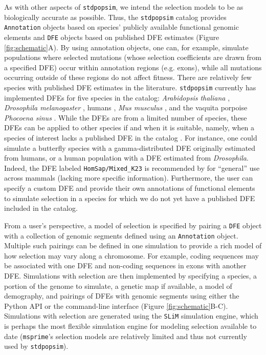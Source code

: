 \documentclass[hidelinks]{article}
\newcommand{\stdpopsim}{\texttt{stdpopsim}\xspace}
\newcommand{\slim}{\texttt{SLiM}\xspace}
\newcommand{\msprime}{\texttt{msprime}\xspace}
\begin{document}
    As with other aspects of \stdpopsim, we intend the selection models to be as biologically accurate as possible.
    Thus, the \stdpopsim catalog provides \texttt{Annotation} objects based on species' publicly available functional genomic elements
    and \texttt{DFE} objects based on published DFE estimates (Figure \ref{fig:schematic}A).
    By using annotation objects, one can, for example, simulate populations where selected mutations (whose selection
    coefficients are drawn from a specified DFE) occur within annotation regions (e.g. exons), while all mutations
    occurring outside of these regions do not affect fitness.
    There are relatively few species with published DFE estimates in the literature.
    \stdpopsim currently has implemented DFEs for five species in the catalog:
    \textit{Arabidopsis thaliana} \citep{huber2018gene},
    \textit{Drosophila melanogaster} \citep{ragsdale2016triallelic,huber2017determining,zhen2021greater},
    humans \citep{huber2017determining,kim2017inference,kyriazis2023using,castellano2019compmarison,castellano2019compmarison,rodrigues2024shared},
    \textit{Mus musculus} \citep{booker2021selective},
    and the vaquita porpoise \textit{Phocoena sinus} \citep{robinson2022critically}.
    While the DFEs are from a limited number of species, these DFEs can be applied to other species
    if and when it is suitable,
    namely, when a species of interest lacks a published DFE in the catalog .
    For instance, one could simulate a butterfly species with a gamma-distributed DFE originally
    estimated from humans, or a human population with a DFE estimated from \textit{Drosophila}.
    Indeed, the DFE labeled \texttt{HomSap/Mixed\_K23} is recommended by \citet{kyriazis2023using}
    for ``general'' use across mammals (lacking more specific information).
    Furthermore, the user can specify a custom DFE and provide their own annotations
    of functional elements to simulate selection in a species for which we do not yet have
    a published DFE included in the catalog.

    From a user's perspective, a model of selection is specified by pairing a \texttt{DFE} object
    with a collection of genomic segments defined using an \texttt{Annotation} object.
    Multiple such pairings can be defined in one simulation
    to provide a rich model of how selection may vary along a chromosome.
    For example, coding sequences may be associated with one DFE and non-coding sequences in exons with another DFE.
    Simulations with selection are then implemented by specifying a species,
    a portion of the genome to simulate,
    a genetic map if available, a model of demography, and pairings of DFEs with genomic segments
    using either the Python API or the command-line interface (Figure \ref{fig:schematic}B-C).
    Simulations with selection are generated
    using the \slim simulation engine, which is perhaps
    the most flexible simulation engine for modeling selection available to date
    (\msprime's selection models are relatively limited and thus not currently used by \stdpopsim).
\end{document}
